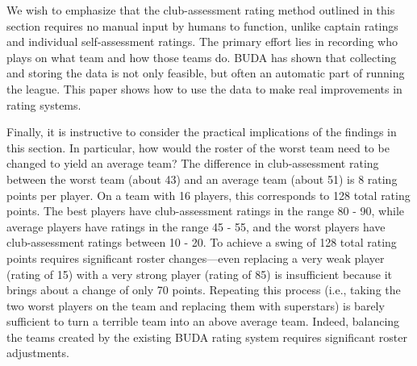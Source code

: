 We wish to emphasize that the club-assessment rating method outlined in this section requires no manual input by humans to function, unlike captain ratings and individual self-assessment ratings. The primary effort lies in recording who plays on what team and how those teams do. BUDA has shown that collecting and storing the data is not only feasible, but often an automatic part of running the league. This paper shows how to use the data to make real improvements in rating systems.

Finally, it is instructive to consider the practical implications of the findings in this section. In particular, how would the roster of the worst team need to be changed to yield an average team? The difference in club-assessment rating between the worst team (about 43) and an average team (about 51) is 8 rating points per player. On a team with 16 players, this corresponds to 128 total rating points. The best players have club-assessment ratings in the range 80 - 90, while average players have ratings in the range 45 - 55, and the worst players have club-assessment ratings between 10 - 20. To achieve a swing of 128 total rating points requires significant roster changes---even replacing a very weak player (rating of 15) with a very strong player (rating of 85) is insufficient because it brings about a change of only 70 points. Repeating this process (i.e., taking the two worst players on the team and replacing them with superstars) is barely sufficient to turn a terrible team into an above average team. Indeed, balancing the teams created by the existing BUDA rating system requires significant roster adjustments. 
